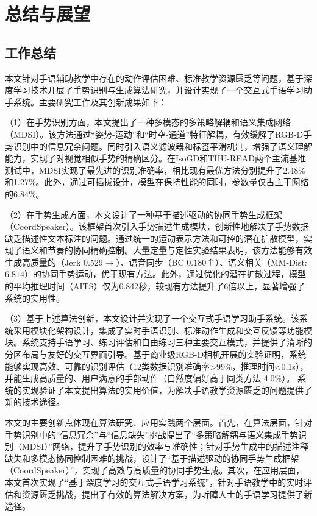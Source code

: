 
\chapter{总结与展望}
\label{sec:summary}

\section{工作总结}
本文针对手语辅助教学中存在的动作评估困难、标准教学资源匮乏等问题，基于深度学习技术开展了手势识别与生成算法研究，并设计实现了一个交互式手语学习助手系统。主要研究工作及其创新成果如下：

（1）在手势识别方面，本文提出了一种多模态的多策略解耦和语义集成网络（MDSI）。该方法通过“姿势-运动”和“时空-通道”特征解耦，有效缓解了RGB-D手势识别中的信息冗余问题。同时引入语义滤波器和标签平滑机制，增强了语义理解能力，实现了对视觉相似手势的精确区分。在IsoGD和THU-READ两个主流基准测试中，MDSI实现了最先进的识别准确率，相比现有最优方法分别提升了2.48\%和1.27\%。此外，通过可插拔设计，模型在保持性能的同时，参数量仅占主干网络的6.84\%。

（2）在手势生成方面，本文设计了一种基于描述驱动的协同手势生成框架（CoordSpeaker）。该框架首次引入手势描述生成模块，创新性地解决了手势数据缺乏描述性文本标注的问题。通过统一的运动表示方法和可控的潜在扩散模型，实现了语义和节奏的协同精确控制。大量定量与定性实验结果表明，该方法能够有效生成高质量的（Jerk $0.529\rightarrow$）、语音同步（BC $0.180\uparrow$）、语义相关（MM-Dist: $6.814$）的协同手势运动，优于现有方法。此外，通过优化的潜在扩散过程，模型的平均推理时间（AITS）仅为0.842秒，较现有方法提升了6倍以上，显著增强了系统的实用性。

（3）基于上述算法创新，本文设计并实现了一个交互式手语学习助手系统。该系统采用模块化架构设计，集成了实时手语识别、标准动作生成和交互反馈等功能模块。系统支持手语学习、练习评估和自由练习三种主要交互模式，并提供了清晰的分区布局与友好的交互界面引导。基于商业级RGB-D相机开展的实验证明，系统能够实现高效、可靠的识别评估（12类数据识别准确率\textgreater 99\%，推理时间\textless 0.1s），并能生成高质量的、用户满意的手部动作（自然度偏好高于同类方法 4.0\%）。
系统的实现验证了本文提出算法的实用价值，为解决手语教学资源匮乏的问题提供了新的技术途径。

本文的主要创新点体现在算法研究、应用实践两个层面。首先，在算法层面，针对手势识别中的“信息冗余”与“信息缺失”挑战提出了“多策略解耦与语义集成手势识别（MDSI）”网络，提升了手势识别的效率与准确性；针对手势生成中的描述注释缺失和多模态协同控制困难的挑战，设计了“基于描述驱动的协同手势生成框架（CoordSpeaker）”，实现了高效与高质量的协同手势生成。其次，在应用层面，本文首次实现了“基于深度学习的交互式手语学习系统”，针对手语教学中的实时评估和资源匮乏挑战，提出了有效的算法解决方案，为听障人士的手语学习提供了新途径。

